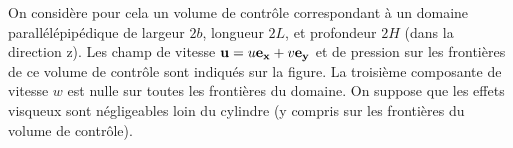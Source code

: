 
 On considère pour cela un volume de contrôle correspondant à un domaine parallélépipédique 
 de largeur $2b$, longueur $2L$, et profondeur $2H$ (dans la direction z).  Les champ de vitesse ${\bf u}   = u {\bf e_x} + v {\bf e_y} $  et de pression sur les frontières de ce volume de contrôle sont indiqués sur la figure. %
 La troisième composante de vitesse $w$ est nulle sur toutes les frontières du domaine.
 On suppose que les effets visqueux sont négligeables loin du cylindre (y compris sur les frontières du volume de contrôle).

